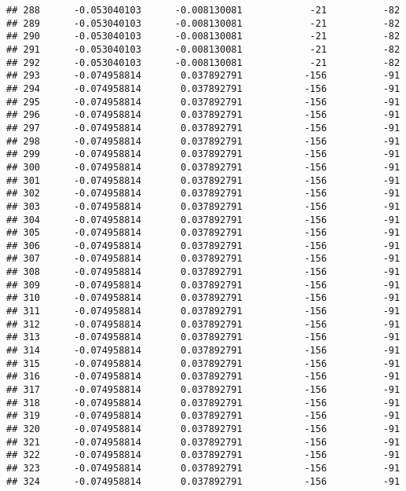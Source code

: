 \documentclass[]{article}
\begin{document}
\begin{verbatim}
## 288      -0.053040103      -0.008130081            -21          -82
## 289      -0.053040103      -0.008130081            -21          -82
## 290      -0.053040103      -0.008130081            -21          -82
## 291      -0.053040103      -0.008130081            -21          -82
## 292      -0.053040103      -0.008130081            -21          -82
## 293      -0.074958814       0.037892791           -156          -91
## 294      -0.074958814       0.037892791           -156          -91
## 295      -0.074958814       0.037892791           -156          -91
## 296      -0.074958814       0.037892791           -156          -91
## 297      -0.074958814       0.037892791           -156          -91
## 298      -0.074958814       0.037892791           -156          -91
## 299      -0.074958814       0.037892791           -156          -91
## 300      -0.074958814       0.037892791           -156          -91
## 301      -0.074958814       0.037892791           -156          -91
## 302      -0.074958814       0.037892791           -156          -91
## 303      -0.074958814       0.037892791           -156          -91
## 304      -0.074958814       0.037892791           -156          -91
## 305      -0.074958814       0.037892791           -156          -91
## 306      -0.074958814       0.037892791           -156          -91
## 307      -0.074958814       0.037892791           -156          -91
## 308      -0.074958814       0.037892791           -156          -91
## 309      -0.074958814       0.037892791           -156          -91
## 310      -0.074958814       0.037892791           -156          -91
## 311      -0.074958814       0.037892791           -156          -91
## 312      -0.074958814       0.037892791           -156          -91
## 313      -0.074958814       0.037892791           -156          -91
## 314      -0.074958814       0.037892791           -156          -91
## 315      -0.074958814       0.037892791           -156          -91
## 316      -0.074958814       0.037892791           -156          -91
## 317      -0.074958814       0.037892791           -156          -91
## 318      -0.074958814       0.037892791           -156          -91
## 319      -0.074958814       0.037892791           -156          -91
## 320      -0.074958814       0.037892791           -156          -91
## 321      -0.074958814       0.037892791           -156          -91
## 322      -0.074958814       0.037892791           -156          -91
## 323      -0.074958814       0.037892791           -156          -91
## 324      -0.074958814       0.037892791           -156          -91

\end{verbatim}
\end{document}

